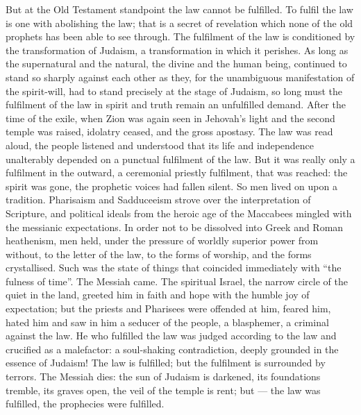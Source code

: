 \documentclass[12pt,a4paper,openany]{book}
\newcommand{\opage}[1]{\marginnote{\footnotesize\textit{[#1]}}}
\begin{document}
But at the Old Testament standpoint the law
cannot be fulfilled. To fulfil the law is one with
abolishing the law; that is a secret of revelation
which none of the old prophets has been able to see through.
The fulfilment of the law is conditioned by the transformation of Judaism,
a transformation in which it perishes.
As long as the supernatural and the natural, the divine and
the human being, continued to stand
so sharply against each other as they, for the unambiguous
manifestation of the spirit-will, had to stand precisely at the stage of Judaism,
so long must the fulfilment of the law in
spirit and truth remain an unfulfilled demand. After
the time of the exile, when Zion was again seen in Jehovah's light
and the second temple was raised, idolatry ceased,
and the gross apostasy. The law was read aloud, the people
listened and understood that its life and independence unalterably %
depended on a punctual fulfilment of the law. But
it was really only a fulfilment in the outward, a
ceremonial priestly fulfilment, that was reached:
the spirit was gone, the prophetic voices had fallen silent.
So men lived on upon a tradition.
Pharisaism and Sadduceeism strove over the interpretation of Scripture,
and political ideals from the heroic age of the Maccabees
mingled with the messianic expectations. In order
\setcounter{footnote}{0}%
\opage{57}not to be dissolved into Greek and Roman heathenism,
men held, under the pressure of worldly superior power from without,
to the letter of the law, to the forms of worship, and the forms
crystallised. Such was the state of things that
coincided immediately with ``the fulness of time''. The Messiah
came. The spiritual Israel, the narrow circle of
the quiet in the land, greeted him in faith and hope with
the humble joy of expectation; but the priests and
Pharisees were offended at him, feared him, hated
him and saw in him a seducer of the people, a blasphemer,
a criminal against the law. He who fulfilled the law
was judged according to the law and crucified as a malefactor: a
soul-shaking contradiction, deeply grounded in the essence
of Judaism! The law is fulfilled; but the fulfilment is surrounded by
terrors. The Messiah dies: the sun of Judaism is darkened,
its foundations tremble, its graves open, the veil
of the temple is rent; but --- the law was fulfilled,
the prophecies were fulfilled.
\end{document}
